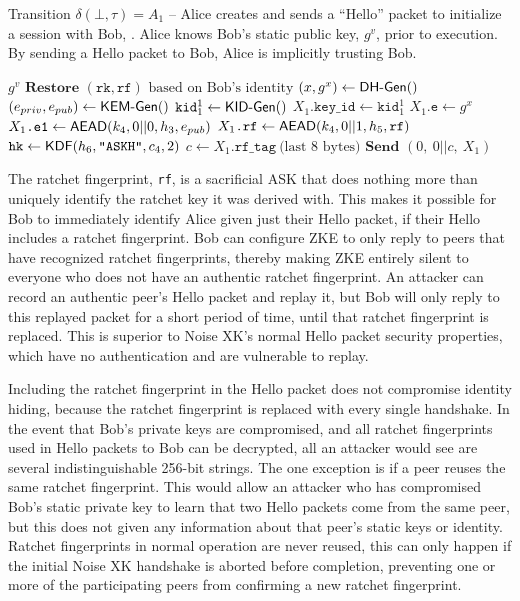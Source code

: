 \documentclass{article}
\begin{document}
\begin{algorithm}\label{alg:x1}
	\caption{Transition $\delta(\bot, \tau)=A_1$ -- Alice creates and sends a ``Hello'' packet to initialize a session with Bob, . Alice knows Bob's static public key, $g^v$, prior to execution. By sending a Hello packet to Bob, Alice is implicitly trusting Bob.}
	\begin{algorithmic}
		\Require $g^v$
		\State $\textbf{Restore } (\texttt{rk}, \texttt{rf}) \text{ based on Bob's identity}$
		\State $(x, g^x) \gets \text{\sf DH-Gen}()$
		\State $(e_{priv}, e_{pub}) \gets \text{\sf KEM-Gen}()$
		\State $\texttt{kid}^1_1 \gets \text{\sf KID-Gen}()$
		\State $X_1\texttt{.key\_id} \gets \texttt{kid}^1_1$
		\State $X_1\texttt{.e} \gets g^x$
		\State $X_1\texttt{.e1} \gets \text{\sf AEAD}(k_4, 0||0, h_3, e_{pub})$
		\State $X_1\texttt{.rf} \gets \text{\sf AEAD}(k_4, 0||1, h_5, \texttt{rf})$
		\State $\texttt{hk} \gets \text{\sf KDF}(h_6, \texttt{"ASKH"}, c_4, 2)$
		\State $c \gets X_1\texttt{.rf\_tag}\ \text{(last 8 bytes)}$
		\State $\textbf{Send } (0,\ 0||c,\ X_1)$
	\end{algorithmic}
\end{algorithm}

The ratchet fingerprint, \texttt{rf}, is a sacrificial ASK that does nothing more than uniquely identify the ratchet key it was derived with. This makes it possible for Bob to immediately identify Alice given just their Hello packet, if their Hello includes a ratchet fingerprint. Bob can configure ZKE to only reply to peers that have recognized ratchet fingerprints, thereby making ZKE entirely silent to everyone who does not have an authentic ratchet fingerprint. An attacker can record an authentic peer's Hello packet and replay it, but Bob will only reply to this replayed packet for a short period of time, until that ratchet fingerprint is replaced. This is superior to Noise XK's normal Hello packet security properties, which have no authentication and are vulnerable to replay.

Including the ratchet fingerprint in the Hello packet does not compromise identity hiding, because the ratchet fingerprint is replaced with every single handshake. In the event that Bob's private keys are compromised, and all ratchet fingerprints used in Hello packets to Bob can be decrypted, all an attacker would see are several indistinguishable 256-bit strings. The one exception is if a peer reuses the same ratchet fingerprint. This would allow an attacker who has compromised Bob's static private key to learn that two Hello packets come from the same peer, but this does not given any information about that peer's static keys or identity. Ratchet fingerprints in normal operation are never reused, this can only happen if the initial Noise XK handshake is aborted before completion, preventing one or more of the participating peers from confirming a new ratchet fingerprint.
\end{document}
